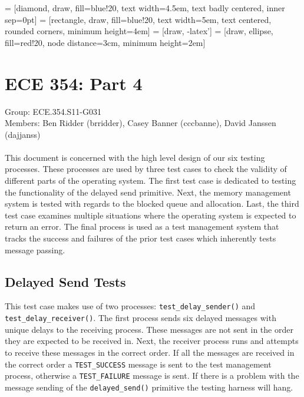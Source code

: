 \documentclass[oneside]{article}
\begin{document}
\lstset{language=C, 
        frame=single, 
        breaklines=true,
        basicstyle=\small\ttfamily,
        columns=fullflexible}

 = [diamond, draw, fill=blue!20, text width=4.5em, text
    badly centered, inner sep=0pt]
 = [rectangle, draw, fill=blue!20, text width=5em, text
    centered, rounded corners, minimum height=4em]
 = [draw, -latex']
 = [draw, ellipse, fill=red!20, node distance=3cm, minimum
    height=2em]

\section*{ECE 354: Part 4}
Group: ECE.354.S11-G031 \\
Members: Ben Ridder (brridder), Casey Banner (cccbanne), 
David Janssen (dajjanss) \\ \\
This document is concerned with the high level design of our six testing 
processes. These processes are used by three test cases to check the 
validity of different parts of the operating system. The first test case is 
dedicated to testing the functionality of the delayed send primitive. Next, the 
memory management system is tested with regards to the blocked queue and 
allocation. Last, the third test case examines multiple situations where the 
operating system is expected to return an error. The final process is used as a 
test management system that tracks the success and failures of the prior test 
cases which inherently tests message passing. 

\subsection*{Delayed Send Tests}
This test case makes use of two processes: \texttt{test\_delay\_sender()} and 
\texttt{test\_delay\_receiver()}. The first process sends six delayed messages 
with unique delays to the receiving process. These messages are not sent in the 
order they are expected to be received in. Next, the receiver process runs and 
attempts to receive these messages in the correct order. If all the messages 
are received in the correct order a \texttt{TEST\_SUCCESS} message is sent to 
the test management process, otherwise a \texttt{TEST\_FAILURE} message is sent.
 If there is a problem with the message sending of the \texttt{delayed\_send()} 
primitive the testing harness will hang.
\end{document}

